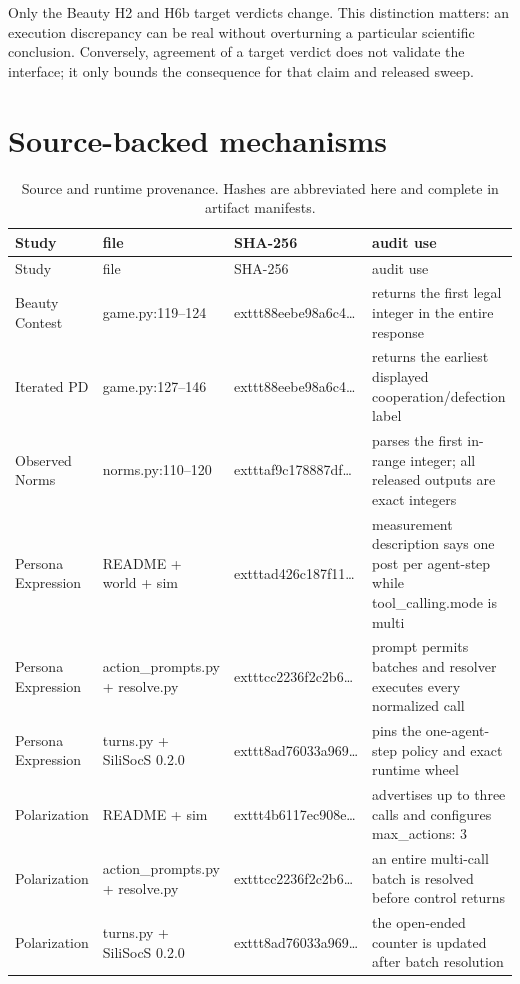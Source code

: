 \documentclass[10pt]{article}
\begin{document}
Only the Beauty H2 and H6b target verdicts change. This distinction matters: an execution discrepancy can be real without overturning a particular scientific conclusion. Conversely, agreement of a target verdict does not validate the interface; it only bounds the consequence for that claim and released sweep.

\section{Source-backed mechanisms}
\begin{landscape}
\small
\begin{longtable}{@{}lp{5.0cm}p{3.2cm}p{10.0cm}@{}}
\caption{Source and runtime provenance. Hashes are abbreviated here and complete in artifact manifests.}\\
\toprule
Study & file & SHA-256 & audit use \\
\midrule
\endfirsthead
\toprule
Study & file & SHA-256 & audit use \\
\midrule
\endhead
Beauty Contest & game.py:119--124 & 	exttt{88eebe98a6c4\ldots} & returns the first legal integer in the entire response \\
Iterated PD & game.py:127--146 & 	exttt{88eebe98a6c4\ldots} & returns the earliest displayed cooperation/defection label \\
Observed Norms & norms.py:110--120 & 	exttt{af9c178887df\ldots} & parses the first in-range integer; all released outputs are exact integers \\
Persona Expression & README + world + sim & 	exttt{ad426c187f11\ldots} & measurement description says one post per agent-step while tool\_calling.mode is multi \\
Persona Expression & action\_prompts.py + resolve.py & 	exttt{cc2236f2c2b6\ldots} & prompt permits batches and resolver executes every normalized call \\
Persona Expression & turns.py + SiliSocS 0.2.0 & 	exttt{8ad76033a969\ldots} & pins the one-agent-step policy and exact runtime wheel \\
Polarization & README + sim & 	exttt{4b6117ec908e\ldots} & advertises up to three calls and configures max\_actions: 3 \\
Polarization & action\_prompts.py + resolve.py & 	exttt{cc2236f2c2b6\ldots} & an entire multi-call batch is resolved before control returns \\
Polarization & turns.py + SiliSocS 0.2.0 & 	exttt{8ad76033a969\ldots} & the open-ended counter is updated after batch resolution \\
\bottomrule
\end{longtable}
\end{landscape}
\end{document}
